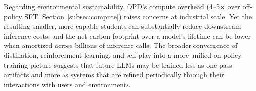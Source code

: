 \documentclass{article} %
\begin{document}
Regarding environmental sustainability, OPD's compute overhead (4--5$\times$ over off-policy SFT, Section~\ref{subsec:compute}) raises concerns at industrial scale. Yet the resulting smaller, more capable students can substantially reduce downstream inference costs, and the net carbon footprint over a model's lifetime can be lower when amortized across billions of inference calls. The broader convergence of distillation, reinforcement learning, and self-play into a more unified on-policy training picture suggests that future LLMs may be trained less as one-pass artifacts and more as systems that are refined periodically through their interactions with users and environments.



\end{document}

